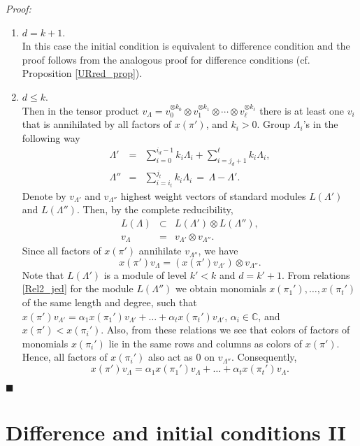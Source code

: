 \documentclass[a4paper, 10pt,oneside]{amsart}
\newenvironment{dokaz}
{\noindent\emph{Proof:}\ }
{\hfill $\blacksquare$}
\begin{document}
\begin{dokaz}
\begin{enumerate}
\item $d=k+1$.\\
In this case the initial condition is equivalent to difference
condition and the proof follows from the analogous proof for
difference conditions (cf. Proposition \ref{URred_prop}).
\item $d\leq k$.\\
Then in the tensor product $v_\Lambda=v_0^{\otimes k_0}\otimes
v_1^{\otimes k_1}\otimes \cdots \otimes v_\ell^{\otimes k_\ell}$
there is at least one $v_i$ that is annihilated by all factors of
$x(\pi')$, and $k_i>0$. Group $\Lambda_i$'s in the following way
\begin{eqnarray*}\Lambda' & = & \sum_{i=0}^{i_d-1} k_i \Lambda_i +
\sum_{i=j_d+1}^{\ell} k_i \Lambda_i,\\ \Lambda'' & =&
\sum_{i=i_t}^{j_t} k_i \Lambda_i\,=\,\Lambda - \Lambda'.
\end{eqnarray*}
Denote by $v_{\Lambda'}$ and $v_{\Lambda''}$ highest weight vectors
of  standard modules $L(\Lambda')$ and $L(\Lambda'')$. Then, by
the complete reducibility,
\begin{eqnarray*}
L(\Lambda)& \subset & L(\Lambda')\otimes L(\Lambda''),\\
v_\Lambda & = & v_{\Lambda'}\otimes v_{\Lambda''}.
\end{eqnarray*}
Since all factors of $x(\pi')$ annihilate $v_{\Lambda''}$, we have
$$x(\pi')v_\Lambda=(x(\pi')v_{\Lambda'})\otimes v_{\Lambda''}.$$
Note that $L(\Lambda')$ is a module of level $k'<k$ and $d=k'+1$.
From relations \eqref{Rel2_jed} for the module $L(\Lambda'')$ we obtain
monomials $x(\pi_1'),\dots,x(\pi_t')$ of the same length and degree,
such that $x(\pi')v_{\Lambda'}=\alpha_1
x(\pi_1')v_{\Lambda'}+\dots+\alpha_t x(\pi_t')v_{\Lambda'}$,
$\alpha_i\in{{\mathbb C}}$, and $x(\pi')<x(\pi_i')$. Also, from these relations
we see that colors of factors of monomials $x(\pi_i')$ lie in the
same rows and columns as colors of $x(\pi')$. Hence, all factors
of $x(\pi_i')$ also act as $0$ on $v_{\Lambda''}$. Consequently,
$$x(\pi')v_{\Lambda}=\alpha_1 x(\pi_1')v_{\Lambda}+\dots+\alpha_t
x(\pi_t')v_{\Lambda}.$$
\end{enumerate}
\end{dokaz}

\section{Difference and initial conditions II}

\label{UR&PU2_pogl}
\end{document}
